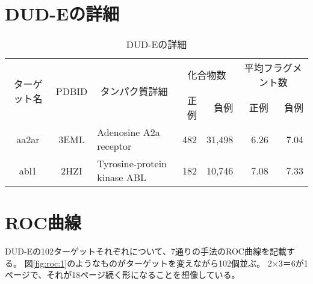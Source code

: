 \appendix
\chapter{DUD-Eの詳細}\label{appendix:dude}
\begin{table}[htb] \centering
	\caption{DUD-Eの詳細}
	\label{tb:dude_description}
	\begin{tabular}{c|c|p{5cm}|rr|rr}
	\hline
	\multirow{2}{*}{ターゲット名}	&\multirow{2}{*}{PDBID}	&\multicolumn{1}{c|}{\multirow{2}{*}{タンパク質詳細}}	&\multicolumn{2}{c|}{化合物数}	&\multicolumn{2}{c}{平均フラグメント数}		\\
							&					&											&正例	&負例				&正例	&負例						\\ \hline
	aa2ar					&3EML				&Adenosine A2a receptor						&482	&31,498				&6.26	&7.04						\\
	abl1						&2HZI				&Tyrosine-protein kinase ABL					&182	&10,746				&7.08	&7.33						\\ \hline
	\end{tabular}
\end{table}

\chapter{ROC曲線}\label{appendix:roc}
DUD-Eの102ターゲットそれぞれについて、7通りの手法のROC曲線を記載する。
図\ref{fig:roc:1}のようなものがターゲットを変えながら102個並ぶ。
2×3＝6が1ページで、それが18ページ続く形になることを想像している。


